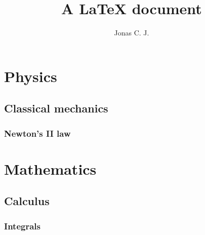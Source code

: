 \documentclass[a4paper, 12pt]{article}
\title{A \LaTeX{} document}
\author{Jonas C. J.}
\begin{document}
\maketitle

\tableofcontents
\newpage
\section{Physics}
\subsection{Classical mechanics}
\lipsum[1-3]
\subsubsection{Newton's II law}
\lipsum[1]

\section{Mathematics}
\subsection{Calculus}
\lipsum[1-5]
\subsubsection{Integrals}
\end{document}
